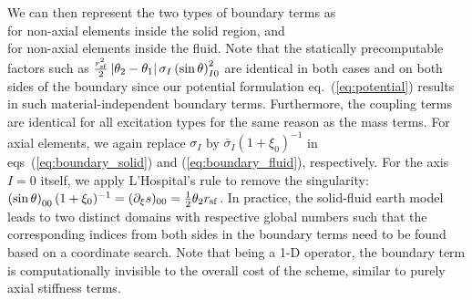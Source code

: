 We can then represent the two types of
boundary terms as
%
\eqa \label{eq:boundary_solid}
\nonumber\\
\ena
%
for non-axial elements inside the solid region, and
%
\eqa \label{eq:boundary_fluid}
\nonumber\\
\ena
%
for non-axial elements inside the fluid. Note that the statically
precomputable factors such as
$\frac{r^2_{\rm sf}}{2}\left|\theta_2-\theta_1\right|\sigma_I
\left(\sin{\theta}\right)_{I0}^2$
are identical in both cases and on both sides of the boundary since our
potential formulation eq.~(\ref{eq:potential}) results in such
material-independent boundary terms. Furthermore, the coupling terms are
identical for all excitation types for the same reason as the mass terms.
For axial elements, we again replace
$\sigma_I$ by $\bar{\sigma}_I\left(1+\xi_0\right)^{-1}$
in eqs~(\ref{eq:boundary_solid}) and (\ref{eq:boundary_fluid}), respectively.
For the axis $I=0$ itself, we apply L'Hospital's rule to remove
the singularity:
$\textstyle{\left(\sin{\theta}\right)_{00} (1+\xi_0)^{-1}=
(\partial_\xi{s})_{00}=\frac{1}{2}\theta_2r_{\rm sf}}$.
%
In practice, the solid-fluid earth model leads to two distinct domains
with respective global numbers such that the corresponding indices from
both sides in the boundary terms need to be found based on a coordinate search.
Note that being a 1-D operator, the boundary term is computationally invisible
to the overall cost of the scheme, similar to purely axial stiffness terms.


